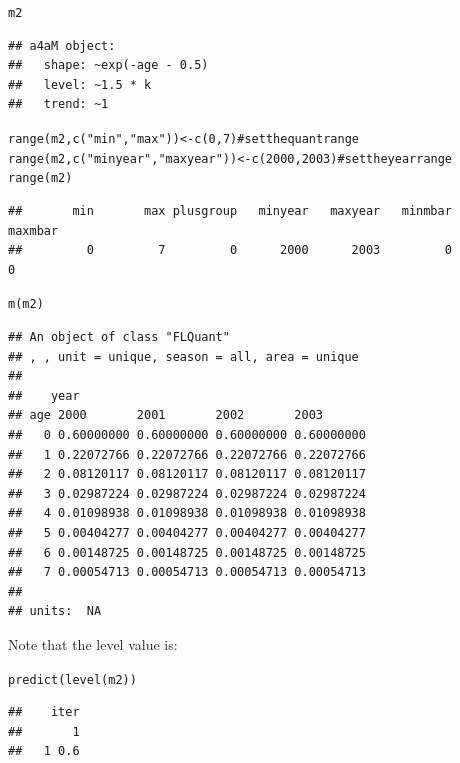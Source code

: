 \documentclass[a4paper,english,10pt]{article}\usepackage[]{graphicx}\usepackage[]{color}
\makeatletter
\newcommand{\hlnum}[1]{\textcolor[rgb]{0.063,0.58,0.627}{#1}}%
\newcommand{\hlstr}[1]{\textcolor[rgb]{0.063,0.58,0.627}{#1}}%
\newcommand{\hlcom}[1]{\textcolor[rgb]{0.588,0.588,0.588}{#1}}%
\newcommand{\hlstd}[1]{\textcolor[rgb]{0.196,0.196,0.196}{#1}}%
\newcommand{\hlkwb}[1]{\textcolor[rgb]{0.627,0,0.314}{#1}}%
\newcommand{\hlkwd}[1]{\textcolor[rgb]{0.78,0.227,0.412}{#1}}%
\newenvironment{kframe}{%
 \def\at@end@of@kframe{}%
 \ifinner\ifhmode%
  \def\at@end@of@kframe{\end{minipage}}%
  \begin{minipage}{\columnwidth}%
 \fi\fi%
 \def\FrameCommand##1{\hskip\@totalleftmargin \hskip-\fboxsep
 \colorbox{shadecolor}{##1}\hskip-\fboxsep
     \hskip-\linewidth \hskip-\@totalleftmargin \hskip\columnwidth}%
 \MakeFramed {\advance\hsize-\width
   \@totalleftmargin\z@ \linewidth\hsize
   \@setminipage}}%
 {\par\unskip\endMakeFramed%
 \at@end@of@kframe}
\newenvironment{knitrout}{}{} %
\makeatother
\begin{document}
\begin{knitrout}
\color{fgcolor}\begin{kframe}
\begin{alltt}
\hlstd{m2}
\end{alltt}
\begin{verbatim}
## a4aM object:
##   shape: ~exp(-age - 0.5)
##   level: ~1.5 * k
##   trend: ~1
\end{verbatim}
\begin{alltt}
\hlkwd{range}\hlstd{(m2,} \hlkwd{c}\hlstd{(}\hlstr{"min"}\hlstd{,} \hlstr{"max"}\hlstd{))} \hlkwb{<-} \hlkwd{c}\hlstd{(}\hlnum{0}\hlstd{,} \hlnum{7}\hlstd{)}  \hlcom{# set the quant range}
\hlkwd{range}\hlstd{(m2,} \hlkwd{c}\hlstd{(}\hlstr{"minyear"}\hlstd{,} \hlstr{"maxyear"}\hlstd{))} \hlkwb{<-} \hlkwd{c}\hlstd{(}\hlnum{2000}\hlstd{,} \hlnum{2003}\hlstd{)}  \hlcom{# set the year range}
\hlkwd{range}\hlstd{(m2)}
\end{alltt}
\begin{verbatim}
##       min       max plusgroup   minyear   maxyear   minmbar   maxmbar 
##         0         7         0      2000      2003         0         0
\end{verbatim}
\begin{alltt}
\hlkwd{m}\hlstd{(m2)}
\end{alltt}
\begin{verbatim}
## An object of class "FLQuant"
## , , unit = unique, season = all, area = unique
## 
##    year
## age 2000       2001       2002       2003      
##   0 0.60000000 0.60000000 0.60000000 0.60000000
##   1 0.22072766 0.22072766 0.22072766 0.22072766
##   2 0.08120117 0.08120117 0.08120117 0.08120117
##   3 0.02987224 0.02987224 0.02987224 0.02987224
##   4 0.01098938 0.01098938 0.01098938 0.01098938
##   5 0.00404277 0.00404277 0.00404277 0.00404277
##   6 0.00148725 0.00148725 0.00148725 0.00148725
##   7 0.00054713 0.00054713 0.00054713 0.00054713
## 
## units:  NA
\end{verbatim}
\end{kframe}
\end{knitrout}

Note that the level value is:

\begin{knitrout}
\color{fgcolor}\begin{kframe}
\begin{alltt}
\hlkwd{predict}\hlstd{(}\hlkwd{level}\hlstd{(m2))}
\end{alltt}
\begin{verbatim}
##    iter
##       1
##   1 0.6
\end{verbatim}
\end{kframe}
\end{knitrout}
\end{document}
